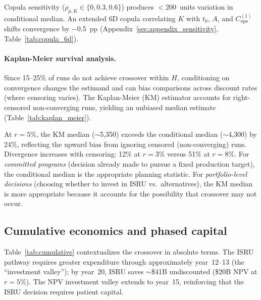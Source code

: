 Copula sensitivity ($\rho_{p,K} \in \{0, 0.3, 0.6\}$) produces $<$200~units variation in conditional median. An extended 6D copula correlating $K$ with $t_0$, $A$, and $C_{\mathrm{ops}}^{(1)}$ shifts convergence by $-$0.5~pp (Appendix~\ref{sec:appendix_sensitivity}, Table~\ref{tab:copula_6d}).

\paragraph{Kaplan-Meier survival analysis.} Since 15--25\% of runs do not achieve crossover within $H$, conditioning on convergence changes the estimand and can bias comparisons across discount rates (where censoring varies). The Kaplan-Meier (KM) estimator \cite{kaplan1958} accounts for right-censored non-converging runs, yielding an unbiased median estimate (Table~\ref{tab:kaplan_meier}).



At $r = 5\%$, the KM median ($\sim$5{,}350) exceeds the conditional median ($\sim$4{,}300) by 24\%, reflecting the upward bias from ignoring censored (non-converging) runs. Divergence increases with censoring: 12\% at $r = 3\%$ versus 51\% at $r = 8\%$. For \emph{committed programs} (decision already made to pursue a fixed production target), the conditional median is the appropriate planning statistic. For \emph{portfolio-level decisions} (choosing whether to invest in ISRU vs.\ alternatives), the KM median is more appropriate because it accounts for the possibility that crossover may not occur.

\subsection{Cumulative economics and phased capital}
\label{sec:phased_capital}

Table~\ref{tab:cumulative} contextualizes the crossover in absolute terms. The ISRU pathway requires greater expenditure through approximately year~12--13 (the ``investment valley''); by year~20, ISRU saves $\sim$\$41B undiscounted (\$20B NPV at $r = 5\%$). The NPV investment valley extends to year~15, reinforcing that the ISRU decision requires patient capital.


